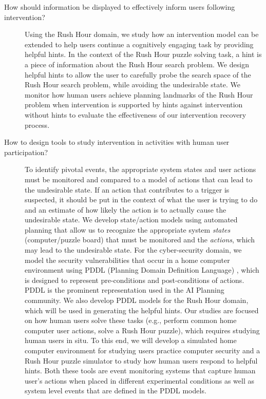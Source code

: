 \begin{description}
\item[How should information be displayed to effectively inform users following intervention?] Using the Rush Hour domain, we study how an intervention model can be extended to help users continue a cognitively engaging task by providing helpful hints. 
In the context of the Rush Hour puzzle solving task, a hint is a piece of information about the Rush Hour search problem. 
We design helpful hints to allow the user to carefully probe the search space of the Rush Hour search problem, while avoiding the undesirable state.
We monitor how human users achieve planning landmarks of the Rush Hour problem when intervention is supported by hints against intervention without hints to evaluate the effectiveness of our intervention recovery process.

\item[How to design tools to study intervention in activities with human user participation?]
To identify pivotal events, the appropriate system states and user actions must be monitored and compared to a model of actions that can lead to the undesirable state. 
If an action that contributes to a trigger is suspected, it should be put in the context of what the user is trying to do and an estimate of how likely the action is to actually cause the undesirable state. 
We develop state/action models using automated planning that allow us to recognize the appropriate system \textit{states} (computer/puzzle board) that must be monitored and the \textit{actions}, which may lead to the undesirable state. 
For the cyber-security domain, we model the security vulnerabilities that occur in a home computer environment using PDDL (Planning Domain Definition Language) \cite{ghallab1998}, which is designed to represent pre-conditions and post-conditions of actions. 
PDDL is the prominent representation used in the AI Planning community. 
We also develop PDDL models for the Rush Hour domain, which will be used in generating the helpful hints. 
Our studies are focused on how human users solve these tasks (e.g., perform common home computer user actions, solve a Rush Hour puzzle), which requires studying human users in situ. 
To this end, we will develop a simulated home computer environment for studying users practice computer security and a Rush Hour puzzle simulator to study how human users respond to helpful hints. 
Both these tools are event monitoring systems that capture human user's actions when placed in different experimental conditions as well as system level events that are defined in the PDDL models.
\end{description}


